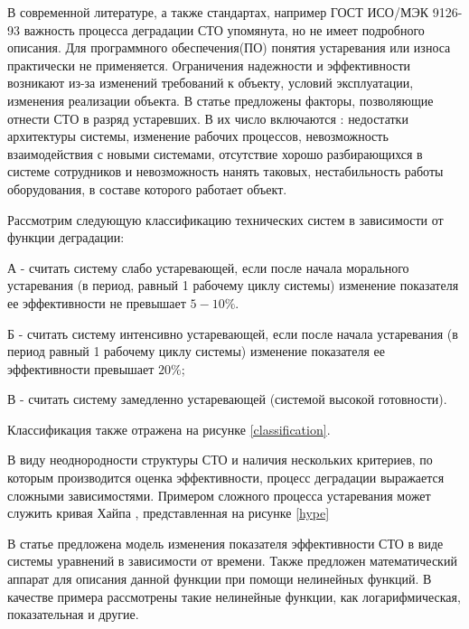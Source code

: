 В современной литературе, а также стандартах, например ГОСТ ИСО/МЭК 9126-93 \cite{ISO} важность процесса деградации СТО упомянута, но не имеет подробного описания.
Для программного обеспечения(ПО) понятия устаревания или износа практически не применяется.
Ограничения надежности и эффективности возникают из-за изменений требований к объекту, условий эксплуатации, изменения реализации объекта.
В статье \cite{Factors} предложены факторы, позволяющие отнести СТО в разряд устаревших. 
В их число включаются \cite{Serpokrylov}: недостатки архитектуры системы, изменение рабочих процессов, невозможность взаимодействия с новыми системами, 
отсутствие хорошо разбирающихся в системе сотрудников и невозможность нанять таковых, нестабильность работы оборудования, в составе которого работает объект. 

Рассмотрим следующую классификацию технических систем в зависимости от функции деградации\cite{Doronina,Serpokrylov}:

А - считать систему слабо устаревающей, если после начала морального устаревания (в период, равный 1 рабочему циклу системы) изменение
показателя ее эффективности не превышает $5-10\%$. 

Б - считать систему интенсивно устаревающей, если после начала устаревания (в период равный 1 рабочему циклу системы) изменение показателя ее эффективности превышает $20\%$;

В - считать систему замедленно устаревающей (системой высокой готовности). 

Классификация также отражена на рисунке \ref{classification}.


В виду неоднородности структуры СТО и наличия нескольких критериев, по которым производится оценка эффективности, процесс деградации выражается сложными зависимостями.
Примером сложного процесса устаревания может служить кривая Хайпа \cite{Litvak}, представленная на рисунке \ref{hype}


В статье \cite{Doronina} предложена модель изменения показателя эффективности СТО в виде системы уравнений в зависимости от времени. 
Также предложен математический аппарат для описания данной функции при помощи нелинейных функций. 
В качестве примера рассмотрены такие нелинейные функции, как логарифмическая, показательная и другие.

